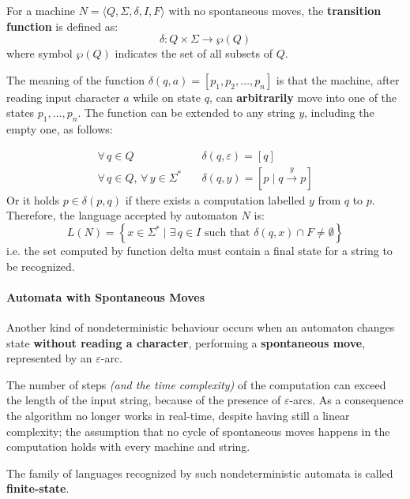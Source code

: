 \documentclass[english]{article}
\begin{document}
\begin{definition}
  \label{def:transition-function}
  For a machine \(N = \langle Q, \Sigma, \delta, I, F \rangle\) with no spontaneous moves, the \textbf{transition function} is defined as:
  \[ \delta : Q \times \Sigma \rightarrow \wp(Q) \]
  where symbol \(\wp(Q)\) indicates the set of all subsets of \(Q\).
\end{definition}

The meaning of the function \(\delta(q, a) = \left[ p_1, p_2, \ldots, p_n \right]\) is that the machine, after reading input character \(a\) while on state \(q\), can \textbf{arbitrarily} move into one of the states \(p_1, \ldots, p_n\).
The function can be extended to any string \(y\), including the empty one, as follows:

\begin{align*}
  \forall \, q \in Q \quad                                  & \delta(q, \varepsilon) = \left[ q \right]                \\
  \forall \, q \in Q, \, \forall \, y \in \Sigma^\ast \quad & \delta(q, y) = \left[ p \mid q \xrightarrow{y} p \right]
\end{align*}
Or it holds \(p \in \delta(p, q)\) if there exists a computation labelled \(y\) from \(q\) to \(p\).
Therefore, the language accepted by automaton \(N\) is:
\[ L(N) = \left\{ x \in \Sigma^\ast \mid \exists \, q \in I \text{ such that } \delta(q, x) \cap F \neq \emptyset \right\} \]
i.e. the set computed by function delta must contain a final state for a string to be recognized.

\paragraph{Automata with Spontaneous Moves}

Another kind of nondeterministic behaviour occurs when an automaton changes state \textbf{without reading a character}, performing a \textbf{spontaneous move}, represented by an \(\varepsilon\)-arc.

The number of steps \textit{(and the time complexity)} of the computation can exceed the length of the input string, because of the presence of \(\varepsilon\)-arcs.
As a consequence the algorithm no longer works in real-time, despite having still a linear complexity;
the assumption that no cycle of spontaneous moves happens in the computation holds with every machine and string.

The family of languages recognized by such nondeterministic automata is called \textbf{finite-state}.
\end{document}
